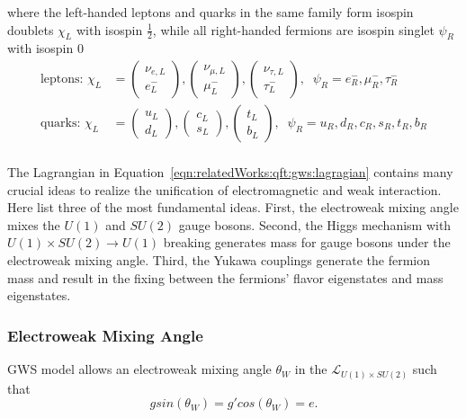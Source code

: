 \noindent where the left-handed leptons and quarks in the same family form isospin doublets $\chi_L$  with isospin $\frac{1}{2}$, while all right-handed fermions are isospin singlet $\psi_R$ with isospin 0
\begin{equation}
\begin{split}
    \text{leptons: }
    \chi_L &= 
    \begin{pmatrix} \nu_{e,L} \\ e^-_{L} \end{pmatrix}, 
    \begin{pmatrix} \nu_{\mu,L} \\ \mu^-_{L} \end{pmatrix},
    \begin{pmatrix} \nu_{\tau,L} \\ \tau^-_{L} \end{pmatrix}, 
    \;\; \psi_R  = e^-_R, \mu^-_R, \tau^-_R \\
    \text{quarks: }
    \chi_L &= 
    \begin{pmatrix} u_{L} \\ d_{L} \end{pmatrix}, 
    \begin{pmatrix} c_{L} \\ s_{L} \end{pmatrix},
    \begin{pmatrix} t_{L} \\ b_{L} \end{pmatrix}, 
    \;\; \psi_R = u_R, d_R, c_R, s_R, t_R, b_R \\
\end{split}
\end{equation}

\noindent The Lagrangian in Equation~\ref{eqn:relatedWorks:qft:gws:lagragian} contains many crucial ideas to realize the unification of electromagnetic and weak interaction. Here list three of the most fundamental ideas. First, the electroweak mixing angle mixes the $U(1)$ and $SU(2)$ gauge bosons. Second, the Higgs mechanism with $U(1)\times SU(2)\to U(1)$ breaking generates mass for gauge bosons under the electroweak mixing angle. Third, the Yukawa couplings generate the fermion mass and result in the fixing between the fermions' flavor eigenstates and mass eigenstates.


\subsubsection{Electroweak Mixing Angle}
GWS model allows an electroweak mixing angle $\theta_W$  in the $\mathcal{L}_{U(1)\times SU(2)}$ such that 
\begin{equation}
    g sin(\theta_W) = g' cos(\theta_W) = e.
\end{equation}

